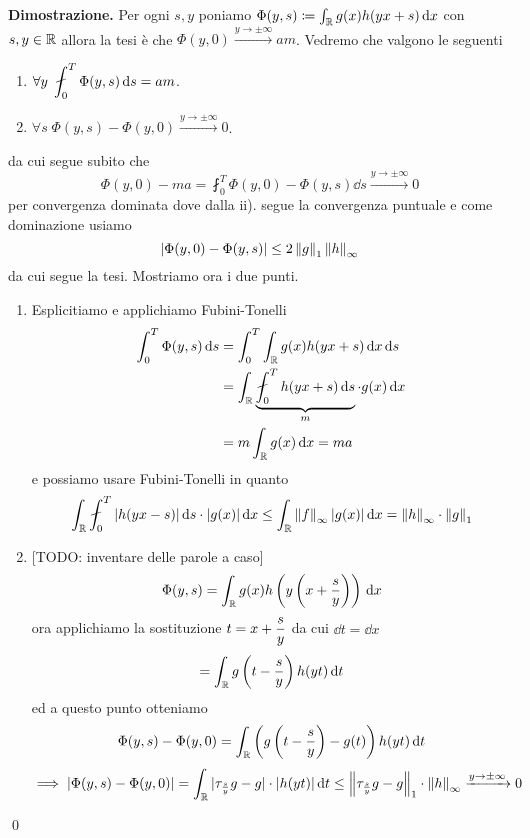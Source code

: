 \textbf{Dimostrazione.}
Per ogni $s, y$ poniamo $\Phi(y, s) \coloneqq \int_\mathbb R g(x) h(yx + s) \,\mathrm{d} x$ con $s, y \in \mathbb R$ allora la tesi è che $\Phi(y, 0) \xrightarrow{y \to \pm\infty} a m$.
Vedremo che valgono le seguenti
\begin{enumerate}
	\item $\forall y \; \ds \fint_0^T \Phi(y, s) \dd s = am$.
	\item $\forall s \; \Phi(y, s) - \Phi(y, 0) \xrightarrow{y \to \pm \infty} 0$.
\end{enumerate}
da cui segue subito che
$$
\Phi(y, 0) - ma = \fint_0^T \Phi(y, 0) - \Phi(y, s) \dd s \xrightarrow{y \to \pm \infty} 0
$$
per convergenza dominata dove dalla ii). segue la convergenza puntuale e come dominazione usiamo
$$
|\Phi(y, 0) - \Phi(y, s)| \leq 2 \left\lVert g \right\rVert_1 \left\lVert h \right\rVert_\infty
$$
da cui segue la tesi. Mostriamo ora i due punti.
\begin{enumerate}
	\item Esplicitiamo e applichiamo Fubini-Tonelli
		$$
		\begin{aligned}
			\int_0^T \Phi(y, s) \dd s
			&= \int_0^T \int_\R g(x) h(yx + s) \dd x \dd s \\
			&= \int_\R \underbrace{\fint_0^T h(yx + s) \dd s}_m \cdot g(x) \dd x \\
			&= m \int_\R g(x) \dd x = m a
		\end{aligned}
		$$
		e possiamo usare Fubini-Tonelli in quanto 
		$$
		\ds \int_\R \fint_0^T |h(yx - s)| \dd s \cdot |g(x)| \dd x \leq \int_\R \norm{f}_\infty |g(x)| \dd x = \norm{h}_\infty \cdot \norm{g}_1
		$$

	\item {} [TODO: inventare delle parole a caso]
		$$
		\Phi(y, s) 
		= \int_\mathbb R g(x) h\left(y \left( x + \frac{s}{y} \right)\right) \,\mathrm{d} x 
		$$
		ora applichiamo la sostituzione $\displaystyle t = x + \frac{s}{y}$ da cui $\dd t = \dd x$
		$$
		= \int_\mathbb R g \left( t - \frac{s}{y} \right) h(yt) \,\mathrm{d} t
		$$
		ed a questo punto otteniamo
		$$
		\Phi(y, s) - \Phi(y, 0) = \int_\mathbb R \left(g\left( t - \frac{s}{y}\right) - g(t) \right) h(yt) \,\mathrm{d} t 
		$$
		$$
		\implies
		|\Phi(y, s) - \Phi(y, 0)| = \int_\mathbb R |\tau_{\frac{s}{y}} g - g| \cdot |h(yt)| \,\mathrm{d} t
		\leq \left\lVert \tau_{\frac{s}{y}} g - g \right\rVert_1 \cdot \left\lVert h \right\rVert_\infty \xrightarrow{y \to \pm \infty} 0
		$$
\end{enumerate}
\qed

